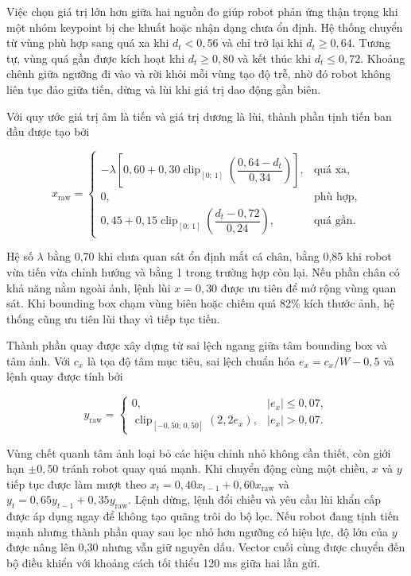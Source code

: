 Việc chọn giá trị lớn hơn giữa hai nguồn đo giúp robot phản ứng thận trọng khi một nhóm keypoint bị che khuất hoặc nhận dạng chưa ổn định. Hệ thống chuyển từ vùng phù hợp sang quá xa khi $d_t<0{,}56$ và chỉ trở lại khi $d_t\geq0{,}64$. Tương tự, vùng quá gần được kích hoạt khi $d_t\geq0{,}80$ và kết thúc khi $d_t\leq0{,}72$. Khoảng chênh giữa ngưỡng đi vào và rời khỏi mỗi vùng tạo độ trễ, nhờ đó robot không liên tục đảo giữa tiến, dừng và lùi khi giá trị dao động gần biên.

Với quy ước giá trị âm là tiến và giá trị dương là lùi, thành phần tịnh tiến ban đầu được tạo bởi

\begin{equation}
x_{\mathrm{raw}}=
\begin{cases}
-\lambda\!\left[0{,}60+0{,}30\operatorname{clip}_{[0;\,1]}\!\left(\dfrac{0{,}64-d_t}{0{,}34}\right)\right], & \text{quá xa},\\[2mm]
0, & \text{phù hợp},\\[1mm]
0{,}45+0{,}15\operatorname{clip}_{[0;\,1]}\!\left(\dfrac{d_t-0{,}72}{0{,}24}\right), & \text{quá gần}.
\end{cases}
\label{eq:tracking_translation}
\end{equation}

Hệ số $\lambda$ bằng 0,70 khi chưa quan sát ổn định mắt cá chân, bằng 0,85 khi robot vừa tiến vừa chỉnh hướng và bằng 1 trong trường hợp còn lại. Nếu phần chân có khả năng nằm ngoài ảnh, lệnh lùi $x=0{,}30$ được ưu tiên để mở rộng vùng quan sát. Khi bounding box chạm vùng biên hoặc chiếm quá 82\% kích thước ảnh, hệ thống cũng ưu tiên lùi thay vì tiếp tục tiến.

Thành phần quay được xây dựng từ sai lệch ngang giữa tâm bounding box và tâm ảnh. Với $c_x$ là tọa độ tâm mục tiêu, sai lệch chuẩn hóa $e_x=c_x/W-0{,}5$ và lệnh quay được tính bởi

\begin{equation}
y_{\mathrm{raw}}=
\begin{cases}
0, & |e_x|\leq0{,}07,\\
\operatorname{clip}_{[-0{,}50;\,0{,}50]}(2{,}2e_x), & |e_x|>0{,}07.
\end{cases}
\label{eq:tracking_steering}
\end{equation}

Vùng chết quanh tâm ảnh loại bỏ các hiệu chỉnh nhỏ không cần thiết, còn giới hạn $\pm0{,}50$ tránh robot quay quá mạnh. Khi chuyển động cùng một chiều, $x$ và $y$ tiếp tục được làm mượt theo $x_t=0{,}40x_{t-1}+0{,}60x_{\mathrm{raw}}$ và $y_t=0{,}65y_{t-1}+0{,}35y_{\mathrm{raw}}$. Lệnh dừng, lệnh đổi chiều và yêu cầu lùi khẩn cấp được áp dụng ngay để không tạo quãng trôi do bộ lọc. Nếu robot đang tịnh tiến mạnh nhưng thành phần quay sau lọc nhỏ hơn ngưỡng có hiệu lực, độ lớn của $y$ được nâng lên 0,30 nhưng vẫn giữ nguyên dấu. Vector cuối cùng được chuyển đến bộ điều khiển với khoảng cách tối thiểu 120 ms giữa hai lần gửi.

